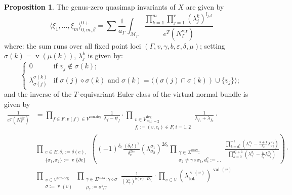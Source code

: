 \documentclass[11pt]{amsart}
\newcommand{\val}{\operatorname{val}}
\newcommand{\vv}{\operatorname{v}}
\theoremstyle{definition}
\newtheorem{prop}[thm]{Proposition}
\theoremstyle{definition}
\begin{document}
\begin{prop}

The genus-zero quasimap invariants of $X$ are given by
\begin{equation}
 \langle \xi_1,\ldots,\xi_m\rangle^{0+}_{0,m,\beta}=\sum \frac{1}{a_\Gamma}\int_{\mathcal M_\Gamma}\frac{\prod_{k=1}^m\prod_{j=1}^r(\lambda^k_j)^{l_{j,k}}}{e^T(N_\Gamma^\text{vir})}
\end{equation}
where: the sum runs over all fixed point loci $\left(\Gamma, v, \gamma, b,\varepsilon,\delta,\mu\right)$; setting $\sigma(k)=\vv(\mu(k))$, $\lambda^k_j$ is given by: 
\begin{equation*}
 \begin{cases}
  0 & \text{if } v_j\notin \sigma(k); \\
  \lambda^{\sigma(k)}_{\sigma(j)} & \text{if } \sigma(j)\diamond\sigma(k) \text{ and } \sigma(k)=\langle(\sigma(j)\cap\sigma(k))\cup\{v_j\}\rangle;
 \end{cases}
\end{equation*}
and the inverse of the $T$-equivariant Euler class of the virtual normal bundle is given by
\begin{equation}
 \begin{aligned}
  \frac{1}{e^T(N_\Gamma^{\text{vir}})}&=\prod_{f\in F\colon v(f)\in V^{\text{non-deg}}} \frac{1}{\lambda_f-\psi_f} \cdot \prod_{\substack{v\in V^\text{deg}_{\val=2}\\ f_i:=(v,e_i)\in F, i=1,2}} \frac{1}{\lambda_{f_1}+\lambda_{f_2}} \cdot \\
  &\prod_{\substack{e\in E, \delta_e:=\delta(e), \\ \{\sigma_1,\sigma_2\}:=\vv\{\partial e\}}}\left( (-1)^{\delta_e}\frac{(\delta_e!)^2}{\delta_e^{2\delta_e}}(\lambda^{\sigma_1}_{\sigma_2})^{2\delta_e}\prod_{\substack{\gamma\in\Sigma^{\text{max}}\colon \\ \sigma_2\neq\gamma\diamond\sigma_1,d^\gamma_e:=\ldots}}\frac{\prod_{k=d^\gamma_e}^{-1}(\lambda^{\sigma_1}_{\gamma}-\frac{k+1}{\delta_e}\lambda^{\sigma_1}_{\sigma_2})}{\prod_{k=0}^{d^\gamma_e+1}(\lambda^{\sigma_1}_{\gamma}-\frac{k}{\delta_e}\lambda^{\sigma_1}_{\sigma_2})} \right) \cdot \\
  & \prod_{\substack{v\in V^{\text{non-deg}}\\ \sigma:=\vv(v)}} \prod_{\substack{\gamma\in\Sigma^{\text{max}}\colon\gamma\diamond\sigma \\ \rho_\gamma:=\sigma\setminus\gamma}}\frac{1}{(\lambda^{\sigma}_{\gamma})^{b(v)\cdot D_{\rho_\gamma}}}\cdot \prod_{v\in V}(\lambda^{\vv(v)}_{\text{tot}})^{\val(v)}
 \end{aligned}
\end{equation}
\end{prop}
\end{document}
